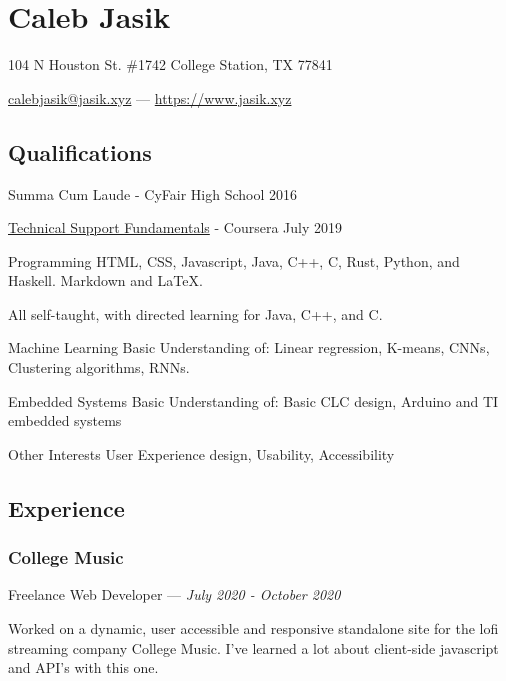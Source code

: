 \documentclass[letterpaper,10pt]{article}
\begin{document}
    \section{\Huge Caleb Jasik}\label{sec:hugecaleb-jasik}

    \hfill 104 N Houston St. \#1742 College Station, TX 77841

    \hfill \href{mailto:calebjasik@jasik.xyz}{calebjasik@jasik.xyz} ---
    \href{https://jasik.xyz}{https://www.jasik.xyz}

    \subsection{Qualifications}\label{subsec:qualifications}

    Summa Cum Laude - CyFair High School 2016

    \href{https://www.coursera.org/account/accomplishments/verify/GZEYJ5VA2YGH}{Technical Support Fundamentals} - Coursera July 2019

    \begin{skills}
        \item[Programming]
        HTML, CSS, Javascript, Java, C++, C, Rust, Python, and Haskell. Markdown and LaTeX.

        All self-taught, with directed learning for Java, C++, and C\@.
        \item[Machine Learning]
        Basic Understanding of: Linear regression, K-means, CNNs, Clustering algorithms, RNNs.
        \item[Embedded Systems]
        Basic Understanding of: Basic CLC design, Arduino and TI embedded systems
        \item[Other Interests]
        User Experience design, Usability, Accessibility
    \end{skills}


    \subsection{Experience}\label{subsec:experience}

    \subsubsection{College Music}
    \hfill Freelance Web Developer --- \emph{July 2020 - October 2020}

    Worked on a dynamic, user accessible and responsive standalone site for the lofi streaming company College Music. I've learned a lot about client-side javascript and API's with this one.
\end{document}
